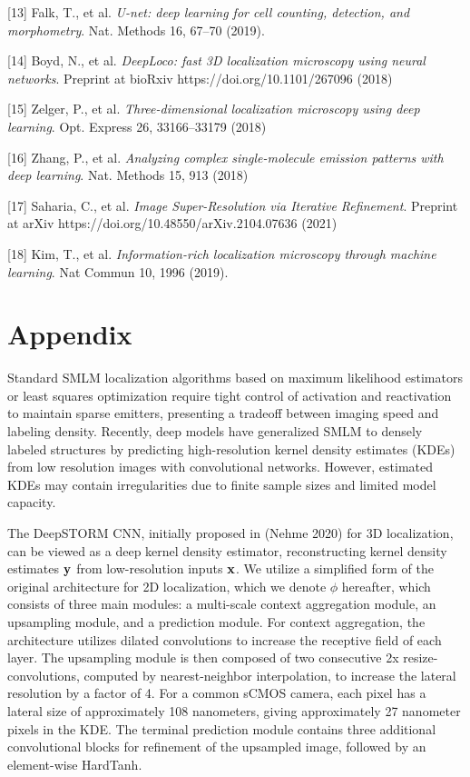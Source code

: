 \documentclass{article}
\begin{document}
{[13] Falk, T., et al. {\it U-net: deep learning for cell counting, detection, and morphometry}. Nat. Methods 16, 67–70 (2019).

[14] Boyd, N., et al. {\it DeepLoco: fast 3D localization microscopy using neural networks}. Preprint at bioRxiv https://doi.org/10.1101/267096 (2018)

[15] Zelger, P., et al. {\it Three-dimensional localization microscopy using deep learning}. Opt. Express 26, 33166–33179 (2018)

[16] Zhang, P., et al. {\it Analyzing complex single-molecule emission patterns with deep learning}. Nat. Methods 15, 913 (2018)

[17] Saharia, C., et al. {\it Image Super-Resolution via Iterative Refinement}. Preprint at arXiv https://doi.org/10.48550/arXiv.2104.07636 (2021)

[18] Kim, T., et al. {\it Information-rich localization microscopy through machine learning}. Nat Commun 10, 1996 (2019). 

}

\appendix

\section{Appendix}

Standard SMLM localization algorithms based on maximum likelihood estimators or least squares optimization require tight control of activation and reactivation to maintain sparse emitters, presenting a tradeoff between imaging speed and labeling density. Recently, deep models have generalized SMLM to densely labeled structures by predicting high-resolution kernel density estimates (KDEs) from low resolution images with convolutional networks. However, estimated KDEs may contain irregularities due to finite sample sizes and limited model capacity. 

The DeepSTORM CNN, initially proposed in (Nehme 2020) for 3D localization, can be viewed as a deep kernel density estimator, reconstructing kernel density estimates $\bold{y}$ from low-resolution inputs $\bold{x}$. We utilize a simplified form of the original architecture for 2D localization, which we denote $\phi$ hereafter, which consists of three main modules: a multi-scale context aggregation module, an upsampling module, and a prediction module. For context aggregation, the architecture utilizes dilated convolutions to increase the receptive field of each layer. The upsampling module is then composed of two consecutive 2x resize-convolutions, computed by nearest-neighbor interpolation, to increase the lateral resolution by a factor of 4. For a common sCMOS camera, each pixel has a lateral size of approximately 108 nanometers, giving approximately 27 nanometer pixels in the KDE. The terminal prediction module contains three additional convolutional blocks for refinement of the upsampled image, followed by an element-wise HardTanh. 
\end{document}
